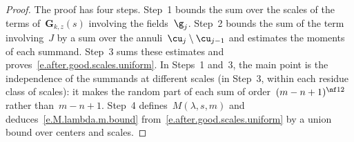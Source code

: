 \documentclass[11pt]{amsart}
\begin{document}
\begin{proof}
The proof has four steps. Step~1 bounds the sum over the scales of the terms of~$\mathbf G_{k,z}(s)$ involving the fields~$\g_j$. Step~2 bounds the sum of the term involving~$J$ by a sum over the annuli~$\cu_j\setminus\cu_{j-1}$ and estimates the moments of each summand. Step~3 sums these estimates and proves~\eqref{e.after.good.scales.uniform}. In Steps~1 and~3, the main point is the independence of the summands at different scales (in Step~3, within each residue class of scales): it makes the random part of each sum of order~$(m-n+1)^{\nf12}$ rather than~$m-n+1$. Step~4 defines~$M(\lambda,s,m)$ and deduces~\eqref{e.M.lambda.m.bound} from~\eqref{e.after.good.scales.uniform} by a union bound over centers and scales.

\smallskip


\end{proof}
\end{document}
